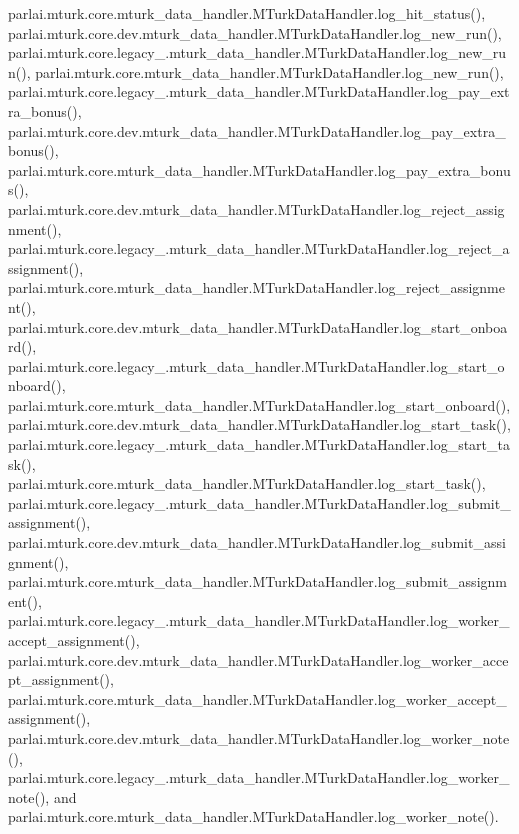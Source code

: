 parlai.\+mturk.\+core.\+mturk\+\_\+data\+\_\+handler.\+M\+Turk\+Data\+Handler.\+log\+\_\+hit\+\_\+status(), parlai.\+mturk.\+core.\+dev.\+mturk\+\_\+data\+\_\+handler.\+M\+Turk\+Data\+Handler.\+log\+\_\+new\+\_\+run(), parlai.\+mturk.\+core.\+legacy\+\_.\+mturk\+\_\+data\+\_\+handler.\+M\+Turk\+Data\+Handler.\+log\+\_\+new\+\_\+run(), parlai.\+mturk.\+core.\+mturk\+\_\+data\+\_\+handler.\+M\+Turk\+Data\+Handler.\+log\+\_\+new\+\_\+run(), parlai.\+mturk.\+core.\+legacy\+\_.\+mturk\+\_\+data\+\_\+handler.\+M\+Turk\+Data\+Handler.\+log\+\_\+pay\+\_\+extra\+\_\+bonus(), parlai.\+mturk.\+core.\+dev.\+mturk\+\_\+data\+\_\+handler.\+M\+Turk\+Data\+Handler.\+log\+\_\+pay\+\_\+extra\+\_\+bonus(), parlai.\+mturk.\+core.\+mturk\+\_\+data\+\_\+handler.\+M\+Turk\+Data\+Handler.\+log\+\_\+pay\+\_\+extra\+\_\+bonus(), parlai.\+mturk.\+core.\+dev.\+mturk\+\_\+data\+\_\+handler.\+M\+Turk\+Data\+Handler.\+log\+\_\+reject\+\_\+assignment(), parlai.\+mturk.\+core.\+legacy\+\_.\+mturk\+\_\+data\+\_\+handler.\+M\+Turk\+Data\+Handler.\+log\+\_\+reject\+\_\+assignment(), parlai.\+mturk.\+core.\+mturk\+\_\+data\+\_\+handler.\+M\+Turk\+Data\+Handler.\+log\+\_\+reject\+\_\+assignment(), parlai.\+mturk.\+core.\+dev.\+mturk\+\_\+data\+\_\+handler.\+M\+Turk\+Data\+Handler.\+log\+\_\+start\+\_\+onboard(), parlai.\+mturk.\+core.\+legacy\+\_.\+mturk\+\_\+data\+\_\+handler.\+M\+Turk\+Data\+Handler.\+log\+\_\+start\+\_\+onboard(), parlai.\+mturk.\+core.\+mturk\+\_\+data\+\_\+handler.\+M\+Turk\+Data\+Handler.\+log\+\_\+start\+\_\+onboard(), parlai.\+mturk.\+core.\+dev.\+mturk\+\_\+data\+\_\+handler.\+M\+Turk\+Data\+Handler.\+log\+\_\+start\+\_\+task(), parlai.\+mturk.\+core.\+legacy\+\_.\+mturk\+\_\+data\+\_\+handler.\+M\+Turk\+Data\+Handler.\+log\+\_\+start\+\_\+task(), parlai.\+mturk.\+core.\+mturk\+\_\+data\+\_\+handler.\+M\+Turk\+Data\+Handler.\+log\+\_\+start\+\_\+task(), parlai.\+mturk.\+core.\+legacy\+\_.\+mturk\+\_\+data\+\_\+handler.\+M\+Turk\+Data\+Handler.\+log\+\_\+submit\+\_\+assignment(), parlai.\+mturk.\+core.\+dev.\+mturk\+\_\+data\+\_\+handler.\+M\+Turk\+Data\+Handler.\+log\+\_\+submit\+\_\+assignment(), parlai.\+mturk.\+core.\+mturk\+\_\+data\+\_\+handler.\+M\+Turk\+Data\+Handler.\+log\+\_\+submit\+\_\+assignment(), parlai.\+mturk.\+core.\+legacy\+\_.\+mturk\+\_\+data\+\_\+handler.\+M\+Turk\+Data\+Handler.\+log\+\_\+worker\+\_\+accept\+\_\+assignment(), parlai.\+mturk.\+core.\+dev.\+mturk\+\_\+data\+\_\+handler.\+M\+Turk\+Data\+Handler.\+log\+\_\+worker\+\_\+accept\+\_\+assignment(), parlai.\+mturk.\+core.\+mturk\+\_\+data\+\_\+handler.\+M\+Turk\+Data\+Handler.\+log\+\_\+worker\+\_\+accept\+\_\+assignment(), parlai.\+mturk.\+core.\+dev.\+mturk\+\_\+data\+\_\+handler.\+M\+Turk\+Data\+Handler.\+log\+\_\+worker\+\_\+note(), parlai.\+mturk.\+core.\+legacy\+\_.\+mturk\+\_\+data\+\_\+handler.\+M\+Turk\+Data\+Handler.\+log\+\_\+worker\+\_\+note(), and parlai.\+mturk.\+core.\+mturk\+\_\+data\+\_\+handler.\+M\+Turk\+Data\+Handler.\+log\+\_\+worker\+\_\+note().

